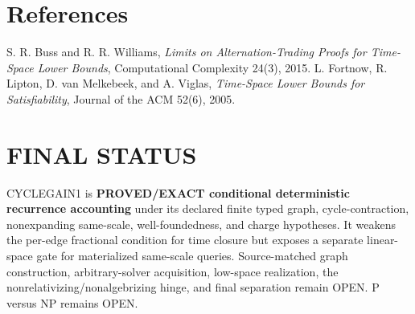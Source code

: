\documentclass[11pt]{article}
\begin{document}
\section*{References}
S. R. Buss and R. R. Williams, \emph{Limits on Alternation-Trading Proofs for Time-Space Lower Bounds}, Computational Complexity 24(3), 2015.
L. Fortnow, R. Lipton, D. van Melkebeek, and A. Viglas, \emph{Time-Space Lower Bounds for Satisfiability}, Journal of the ACM 52(6), 2005.

\section*{FINAL STATUS}
CYCLEGAIN1 is \textbf{PROVED/EXACT conditional deterministic recurrence accounting} under its declared finite typed graph, cycle-contraction, nonexpanding same-scale, well-foundedness, and charge hypotheses. It weakens the per-edge fractional condition for time closure but exposes a separate linear-space gate for materialized same-scale queries. Source-matched graph construction, arbitrary-solver acquisition, low-space realization, the nonrelativizing/nonalgebrizing hinge, and final separation remain OPEN. P versus NP remains OPEN.

\end{document}
